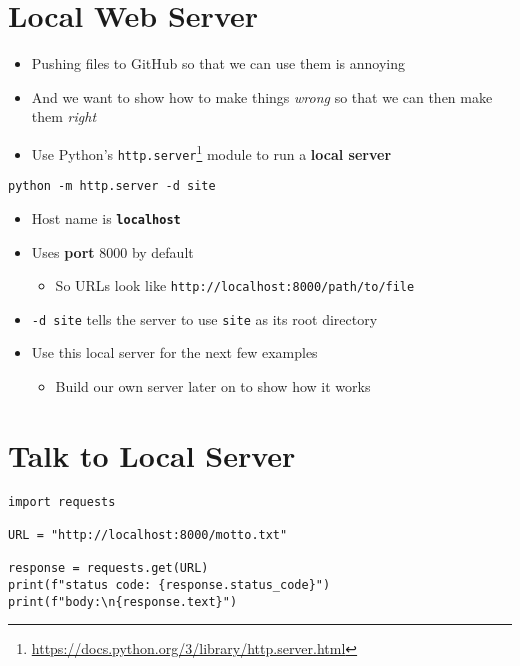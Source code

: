 \documentclass[krantzl]{krantz}
\newcommand{\glossref}[1]{\textbf{#1}}
\newcommand{\hreffoot}[2]{{#1}\footnote{\href{#2}{#2}}}
\begin{document}
\section{Local Web Server}
\begin{itemize}
\item Pushing files to GitHub so that we can use them is annoying

\item And we want to show how to make things \emph{wrong} so that we can then make them \emph{right}

\item Use Python’s \hreffoot{\texttt{http.server}}{https://docs.python.org/3/library/http.server.html} module
    to run a \glossref{local server}

\end{itemize}
\begin{lstlisting}[frame=tblr]
python -m http.server -d site
\end{lstlisting}

\begin{itemize}
\item Host name is \glossref{\texttt{localhost}}

\item Uses \glossref{port} 8000 by default\begin{itemize}
\item So URLs look like \texttt{http://localhost:8000/path/to/file}

\end{itemize}


\item \texttt{-d site} tells the server to use \texttt{site} as its root directory

\item Use this local server for the next few examples\begin{itemize}
\item Build our own server later on to show how it works

\end{itemize}


\end{itemize}
\section{Talk to Local Server}
\begin{lstlisting}[frame=tblr]
import requests

URL = "http://localhost:8000/motto.txt"

response = requests.get(URL)
print(f"status code: {response.status_code}")
print(f"body:\n{response.text}")
\end{lstlisting}
\end{document}
